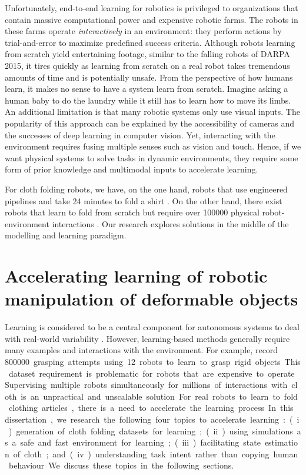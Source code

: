 \documentclass[\home/main.tex]{subfiles}
\begin{document}
Unfortunately, end-to-end learning for robotics is privileged to organizations that contain massive computational power and expensive robotic farms. The robots in these farms operate \emph{interactively} in an environment: they perform actions by trial-and-error to maximize predefined success criteria. Although robots learning from scratch yield entertaining footage, similar to the falling robots of DARPA 2015, it tires quickly as learning from scratch on a real robot takes tremendous amounts of time and is potentially unsafe. From the perspective of how humans learn, it makes no sense to have a system learn from scratch. Imagine asking a human baby to do the laundry while it still has to learn how to move its limbs.
An additional limitation is that many robotic systems only use visual inputs. The popularity of this approach can be explained by the accessibility of cameras and the successes of deep learning in computer vision. Yet, interacting with the environment requires fusing multiple senses such as vision and touch.
Hence, if we want physical systems to solve tasks in dynamic environments, they require some form of prior knowledge and multimodal inputs to accelerate learning.

For cloth folding robots, we have, on the one hand, robots that use engineered pipelines and take 24 minutes to fold a shirt \autocite{Maitin2010}. On the other hand, there exist robots that learn to fold from scratch but require over \qty{100000}{} physical robot-environment interactions \autocite{Matas2018}. Our research explores solutions in the middle of the modelling and learning paradigm.



\section{Accelerating learning of robotic manipulation of deformable objects} \label{sec:intro_acc_learning}
Learning is considered to be a central component for autonomous systems to deal with real-world variability \autocite{kroemer2021review}. However, learning-based methods generally require many examples and interactions with the environment. For example, \textcite{Levine2018} record \qty{800000} grasping attempts using \qty{12} robots to learn to grasp rigid objects. This dataset requirement is problematic for robots that are expensive to operate. Supervising multiple robots simultaneously for millions of interactions with cloth is an unpractical and unscalable solution. For real robots to learn to fold clothing articles, there is a need to accelerate the learning process. In this dissertation, we research the following four topics to accelerate learning:
(i) generation of cloth folding datasets for learning;
(ii) using simulations as a safe and fast environment for learning;
(iii) facilitating state estimation of cloth; and
(iv) understanding task intent rather than copying human behaviour.
We discuss these topics in the following sections.
\end{document}
